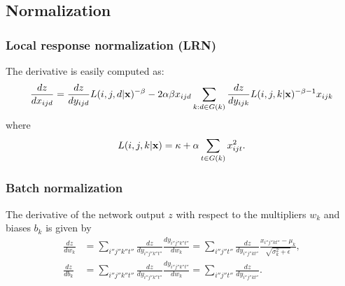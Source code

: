 \subsection{Normalization}\label{s:normalization}

\subsubsection{Local response normalization (LRN)}\label{s:impl-ccnormalization}

The derivative is easily computed as:
\[
\frac{dz}{d x_{ijd}}
=
\frac{dz}{d y_{ijd}}
L(i,j,d|\mathbf{x})^{-\beta}
-2\alpha\beta x_{ijd}
\sum_{k:d\in G(k)}
\frac{dz}{d y_{ijk}}
L(i,j,k|\mathbf{x})^{-\beta-1} x_{ijk} 
\]
where
\[
L(i,j,k|\mathbf{x}) = \kappa + \alpha \sum_{t\in G(k)} x_{ijt}^2.
\]

\subsubsection{Batch normalization}\label{s:impl-bnorm}

The derivative of the network output $z$ with respect to the multipliers $w_k$ and biases $b_k$ is given by
\begin{align*}
\frac{dz}{dw_k} &= \sum_{i''j''k''t''}
\frac{dz}{d y_{i''j''k''t''}} 
\frac{d y_{i''j''k''t''}}{d w_k}
=
\sum_{i''j''t''}
\frac{dz}{d y_{i''j''kt''}} 
\frac{x_{i''j''kt''} - \mu_{k}}{\sqrt{\sigma_k^2 + \epsilon}},
\\
\frac{dz}{db_k} &= \sum_{i''j''k''t''}
\frac{dz}{d y_{i''j''k''t''}} 
\frac{d y_{i''j''k''t''}}{d w_k}
=
\sum_{i''j''t''}
\frac{dz}{d y_{i''j''kt''}}.
\end{align*}

